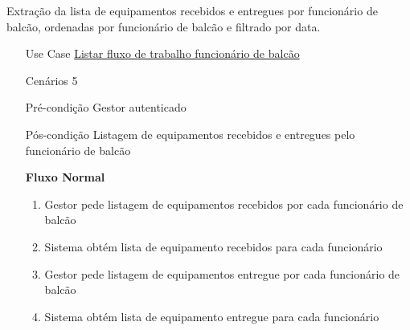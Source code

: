 \documentclass[../relatorio.tex]{subfiles}
\begin{document}
Extração da lista de equipamentos recebidos e entregues por funcionário de balcão,
ordenadas por funcionário de balcão e filtrado por data.
\begin{itemize}
    \item[Use Case] {\underline{Listar fluxo de trabalho funcionário de balcão}}
    \item[Cenários] {5}
    \item[Pré-condição] {Gestor autenticado}
    \item[Pós-condição] {Listagem de equipamentos recebidos e entregues pelo funcionário de balcão}
          \begin{flushleft}
              \textbf{Fluxo Normal}
          \end{flushleft}
          \begin{enumerate}
              \item Gestor pede listagem de equipamentos recebidos por cada funcionário de balcão
              \item Sistema obtém lista de equipamento recebidos para cada funcionário
              \item Gestor pede listagem de equipamentos entregue por cada funcionário de balcão
              \item Sistema obtém lista de equipamento entregue para cada funcionário
          \end{enumerate}
\end{itemize}
\end{document}
